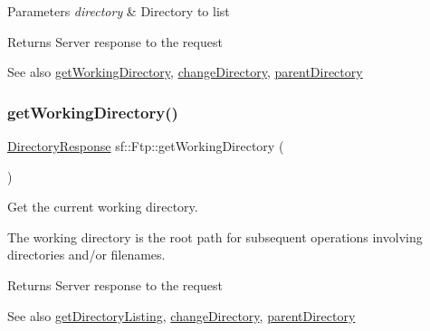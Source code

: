 \begin{DoxyParams}{Parameters}
{\em directory} & Directory to list\\
\hline
\end{DoxyParams}
\begin{DoxyReturn}{Returns}
Server response to the request
\end{DoxyReturn}
\begin{DoxySeeAlso}{See also}
\hyperlink{classsf_1_1_ftp_a79c654fcdd0c81e68c4fa29af3b45e0c}{get\+Working\+Directory}, \hyperlink{classsf_1_1_ftp_a7e93488ea6330dd4dd76e428da9bb6d3}{change\+Directory}, \hyperlink{classsf_1_1_ftp_ad295cf77f30f9ad07b5c401fd9849189}{parent\+Directory} 
\end{DoxySeeAlso}
\mbox{\label{classsf_1_1_ftp_a79c654fcdd0c81e68c4fa29af3b45e0c}} 
\subsubsection{\texorpdfstring{get\+Working\+Directory()}{getWorkingDirectory()}}
{\footnotesize\ttfamily \hyperlink{classsf_1_1_ftp_1_1_directory_response}{Directory\+Response} sf\+::\+Ftp\+::get\+Working\+Directory (\begin{DoxyParamCaption}{ }\end{DoxyParamCaption})}



Get the current working directory. 

The working directory is the root path for subsequent operations involving directories and/or filenames.

\begin{DoxyReturn}{Returns}
Server response to the request
\end{DoxyReturn}
\begin{DoxySeeAlso}{See also}
\hyperlink{classsf_1_1_ftp_a8f37258e461fcb9e2a0655e9df0be4a0}{get\+Directory\+Listing}, \hyperlink{classsf_1_1_ftp_a7e93488ea6330dd4dd76e428da9bb6d3}{change\+Directory}, \hyperlink{classsf_1_1_ftp_ad295cf77f30f9ad07b5c401fd9849189}{parent\+Directory} 
\end{DoxySeeAlso}
\mbox{\label{classsf_1_1_ftp_aa1127d442b4acb2105aa8060a39d04fc}} 
